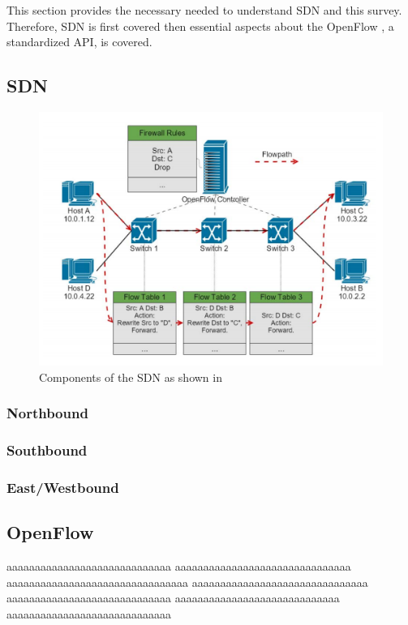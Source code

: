 This section provides the necessary needed to understand SDN and this survey.
Therefore, SDN is first covered then essential aspects about the OpenFlow \cite{mckeown2008openflow}, a standardized API,
is covered.
\subsection{SDN}

  \begin{figure}[t]
    \includegraphics[width=\linewidth]{firewall_bypass.png}
    \caption{Components of the SDN as shown in \cite{sdn_manual}}
    \label{fig:sdn}
  \end{figure}

  \subsubsection{Northbound}

  \subsubsection{Southbound}

  \subsubsection{East/Westbound}

\subsection{OpenFlow}

aaaaaaaaaaaaaaaaaaaaaaaaaaaaa
aaaaaaaaaaaaaaaaaaaaaaaaaaaaaaa
aaaaaaaaaaaaaaaaaaaaaaaaaaaaaaaa
aaaaaaaaaaaaaaaaaaaaaaaaaaaaaaa
aaaaaaaaaaaaaaaaaaaaaaaaaaaaa
aaaaaaaaaaaaaaaaaaaaaaaaaaaaa
aaaaaaaaaaaaaaaaaaaaaaaaaaaaa
